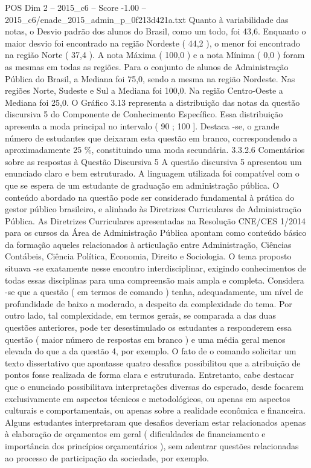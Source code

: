 \begin{textsample}{POS Dim 2 – 2015\_c6 – Score -1.00 – 2015\_c6/enade\_2015\_admin\_p\_0f213d421a.txt}
Quanto à variabilidade das notas, o Desvio padrão dos alunos do Brasil, como um todo, foi 43,6.
Enquanto o maior desvio foi encontrado na região Nordeste ( 44,2 ), o menor foi encontrado na região Norte ( 37,4 ).
A nota Máxima ( 100,0 ) e a nota Mínima ( 0,0 ) foram as mesmas em todas as regiões.
Para o conjunto de alunos de Administração Pública do Brasil, a Mediana foi 75,0, sendo a mesma na região Nordeste.
Nas regiões Norte, Sudeste e Sul a Mediana foi 100,0.
Na região Centro-Oeste a Mediana foi 25,0.
O Gráfico 3.13 representa a distribuição das notas da questão discursiva 5 do Componente de Conhecimento Específico.
Essa distribuição apresenta a moda principal no intervalo ( 90 ; 100 ].
Destaca -se, o grande número de estudantes que deixaram esta questão em branco, correspondendo a aproximadamente 25 \%, constituindo uma moda secundária. 3.3.2.6 Comentários sobre as respostas à Questão Discursiva 5 A questão discursiva 5 apresentou um enunciado claro e bem estruturado.
A linguagem utilizada foi compatível com o que se espera de um estudante de graduação em administração pública.
O conteúdo abordado na questão pode ser considerado fundamental à prática do gestor público brasileiro, e alinhado às Diretrizes Curriculares de Administração Pública.
As Diretrizes Curriculares apresentadas na Resolução CNE/CES 1/2014 para os cursos da Área de Administração Pública apontam como conteúdo básico da formação aqueles relacionados à articulação entre Administração, Ciências Contábeis, Ciência Política, Economia, Direito e Sociologia.
O tema proposto situava -se exatamente nesse encontro interdisciplinar, exigindo conhecimentos de todas essas disciplinas para uma compreensão mais ampla e completa.
Considera -se que a questão ( em termos de comando ) tenha, adequadamente, um nível de profundidade de baixo a moderado, a despeito da complexidade do tema.
Por outro lado, tal complexidade, em termos gerais, se comparada a das duas questões anteriores, pode ter desestimulado os estudantes a responderem essa questão ( maior número de respostas em branco ) e uma média geral menos elevada do que a da questão 4, por exemplo.
O fato de o comando solicitar um texto dissertativo que apontasse quatro desafios possibilitou que a atribuição de pontos fosse realizada de forma clara e estruturada.
Entretanto, cabe destacar que o enunciado possibilitava interpretações diversas do esperado, desde focarem exclusivamente em aspectos técnicos e metodológicos, ou apenas em aspectos culturais e comportamentais, ou apenas sobre a realidade econômica e financeira.
Alguns estudantes interpretaram que desafios deveriam estar relacionados apenas à elaboração de orçamentos em geral ( dificuldades de financiamento e importância dos princípios orçamentários ), sem adentrar questões relacionadas ao processo de participação da sociedade, por exemplo.

\end{textsample}
